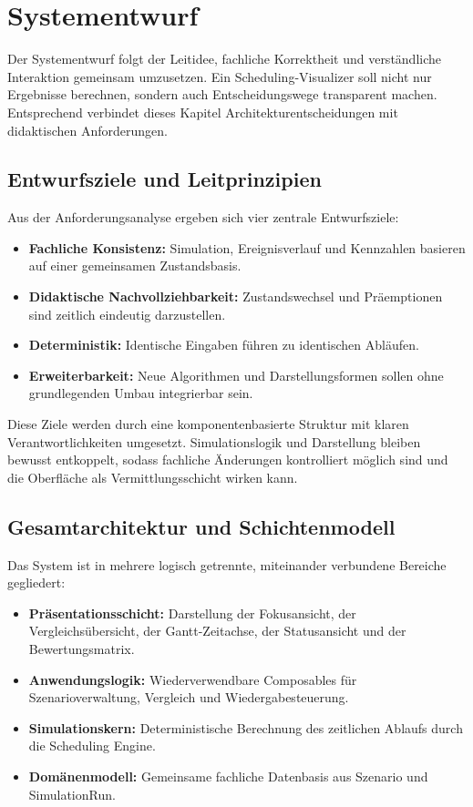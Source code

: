 \chapter{Systementwurf}
\label{chap:systementwurf}

Der Systementwurf folgt der Leitidee, fachliche Korrektheit und verständliche Interaktion gemeinsam umzusetzen. Ein Scheduling-Visualizer soll nicht nur Ergebnisse berechnen, sondern auch Entscheidungswege transparent machen. Entsprechend verbindet dieses Kapitel Architekturentscheidungen mit didaktischen Anforderungen.

\section{Entwurfsziele und Leitprinzipien}

Aus der Anforderungsanalyse ergeben sich vier zentrale Entwurfsziele:

\begin{itemize}
    \item \textbf{Fachliche Konsistenz:} Simulation, Ereignisverlauf und Kennzahlen basieren auf einer gemeinsamen Zustandsbasis.
    \item \textbf{Didaktische Nachvollziehbarkeit:} Zustandswechsel und Präemptionen sind zeitlich eindeutig darzustellen.
    \item \textbf{Deterministik:} Identische Eingaben führen zu identischen Abläufen.
    \item \textbf{Erweiterbarkeit:} Neue Algorithmen und Darstellungsformen sollen ohne grundlegenden Umbau integrierbar sein.
\end{itemize}

Diese Ziele werden durch eine komponentenbasierte Struktur mit klaren Verantwortlichkeiten umgesetzt. Simulationslogik und Darstellung bleiben bewusst entkoppelt, sodass fachliche Änderungen kontrolliert möglich sind und die Oberfläche als Vermittlungsschicht wirken kann.

\section{Gesamtarchitektur und Schichtenmodell}

Das System ist in mehrere logisch getrennte, miteinander verbundene Bereiche gegliedert:

\begin{itemize}
    \item \textbf{Präsentationsschicht:} Darstellung der Fokusansicht, der Vergleichsübersicht, der Gantt-Zeitachse, der Statusansicht und der Bewertungsmatrix.
    \item \textbf{Anwendungslogik:} Wiederverwendbare Composables für Szenarioverwaltung, Vergleich und Wiedergabesteuerung.
    \item \textbf{Simulationskern:} Deterministische Berechnung des zeitlichen Ablaufs durch die Scheduling Engine.
    \item \textbf{Domänenmodell:} Gemeinsame fachliche Datenbasis aus Szenario und SimulationRun.
\end{itemize}

